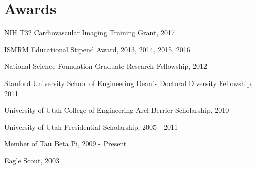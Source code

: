 \section{\sc Awards}
% 
\begin{list2}
    \item NIH T32 Cardiovascular Imaging Training Grant, 2017
    \item ISMRM Educational Stipend Award, 2013, 2014, 2015, 2016
    \item National Science Foundation Graduate Research Fellowship, 2012
    \item Stanford University School of Engineering Dean's Doctoral Diversity Fellowship, 2011
    \item University of Utah College of Engineering Arel Berrier Scholarship, 2010
    \item University of Utah Presidential Scholarship, 2005 - 2011
    \item Member of Tau Beta Pi, 2009 - Present
    \item Eagle Scout, 2003
\end{list2}

